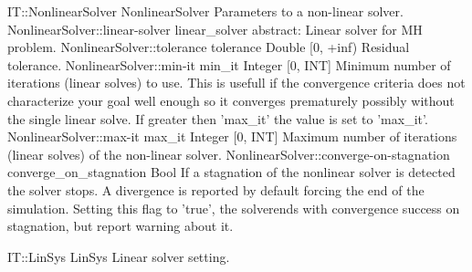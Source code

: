 \begin{RecordType}
	{IT::NonlinearSolver}
	{NonlinearSolver}
	{}%
	{}%
	{{{Parameters to a non-linear solver.}%
}}
		\RecKey
			{NonlinearSolver::linear-solver}
			{linear{\_}solver}
			{{abstract: }}{}
			{ \ValueDefault{{\{}{\}}}}
			{{{Linear solver for MH problem.}%
}}
		\RecKey
			{NonlinearSolver::tolerance}
			{tolerance}
			{{Double [0, +inf)}}{}
			{ }
			{{{Residual tolerance.}%
}}
		\RecKey
			{NonlinearSolver::min-it}
			{min{\_}it}
			{{Integer [0, INT]}}{}
			{ }
			{{{Minimum number of iterations (linear solves) to use.
This is usefull if the convergence criteria does not characterize your goal well enough so it converges prematurely possibly without the single linear solve.
If greater then 'max{\_}it' the value is set to 'max{\_}it'.}%
}}
		\RecKey
			{NonlinearSolver::max-it}
			{max{\_}it}
			{{Integer [0, INT]}}{}
			{ }
			{{{Maximum number of iterations (linear solves) of the non-linear solver.}%
}}
		\RecKey
			{NonlinearSolver::converge-on-stagnation}
			{converge{\_}on{\_}stagnation}
			{{Bool}}{}
			{ }
			{{{If a stagnation of the nonlinear solver is detected the solver stops.
A divergence is reported by default forcing the end of the simulation.
Setting this flag to 'true', the solverends with convergence success on stagnation, but report warning about it.}%
}}
\end{RecordType}
\begin{AbstractType}
	{IT::LinSys}
	{LinSys}
	{}
	{{{Linear solver setting.}%
}}
\end{AbstractType}
